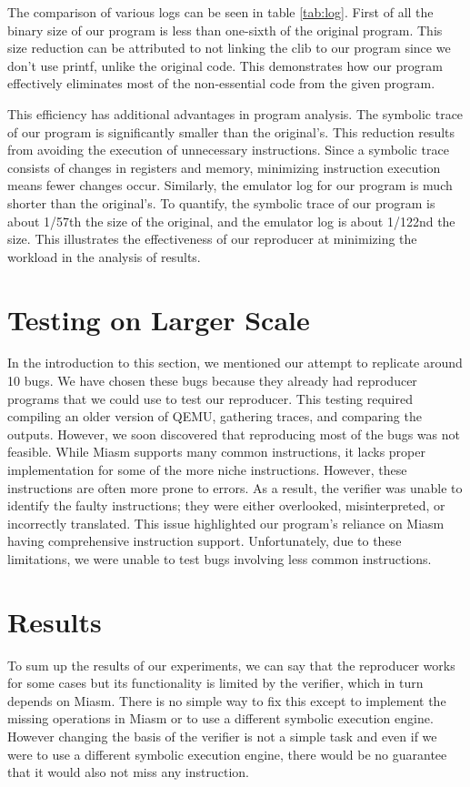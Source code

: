 The comparison of various logs can be seen in table \ref{tab:log}.
First of all the binary size of our program is less than one-sixth of the original program.
This size reduction can be attributed to not linking the \ac{clib} to our program since we don't use printf, unlike the original code.
This demonstrates how our program effectively eliminates most of the non-essential code from the given program.

This efficiency has additional advantages in program analysis.
The symbolic trace of our program is significantly smaller than the original's.
This reduction results from avoiding the execution of unnecessary instructions.
Since a symbolic trace consists of changes in registers and memory, minimizing instruction execution means fewer changes occur.
Similarly, the emulator log for our program is much shorter than the original's.
To quantify, the symbolic trace of our program is about 1/57th the size of the original, and the emulator log is about 1/122nd the size.
This illustrates the effectiveness of our reproducer at minimizing the workload in the analysis of results.



\section{Testing on Larger Scale}
In the introduction to this section, we mentioned our attempt to replicate around 10 bugs.
We have chosen these bugs because they already had reproducer programs that we could use to test our reproducer.
This testing required compiling an older version of \ac{QEMU}, gathering traces, and comparing the outputs.
However, we soon discovered that reproducing most of the bugs was not feasible.
While Miasm supports many common instructions, it lacks proper implementation for some of the more niche instructions.
However, these instructions are often more prone to errors.
As a result, the verifier was unable to identify the faulty instructions; they were either overlooked, misinterpreted, or incorrectly translated.
This issue highlighted our program's reliance on Miasm having comprehensive instruction support.
Unfortunately, due to these limitations, we were unable to test bugs involving less common instructions.

\section{Results}
To sum up the results of our experiments, we can say that the reproducer works for some cases but its functionality is limited by the verifier, which in turn depends on Miasm.
There is no simple way to fix this except to implement the missing operations in Miasm or to use a different symbolic execution engine.
However changing the basis of the verifier is not a simple task and even if we were to use a different symbolic execution engine, there would be no guarantee that it would also not miss any instruction.

